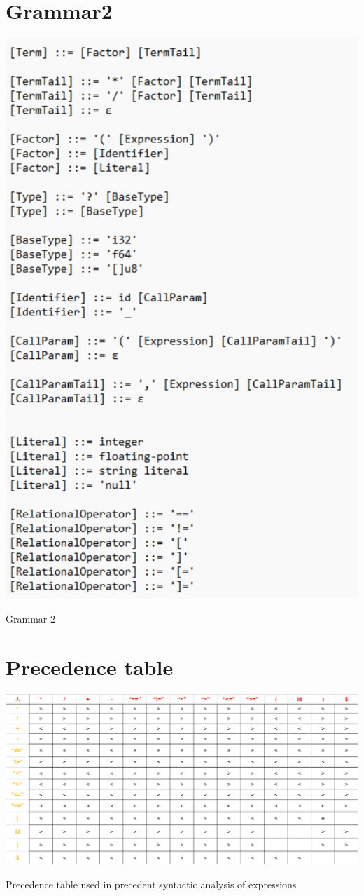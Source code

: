 \documentclass[a4paper, 11pt]{article}
\begin{document}
    
	\begin{table}[!ht]
        \section{Grammar2}
		\centering
		\includegraphics[width=0.7\linewidth]{Grammar2.pdf}
		\caption{Grammar 2}
		\label{table:png2pdf (2).pdf}
	\end{table}




	
	\begin{table}[!ht]
        \section{Precedence table}
		\centering
		\includegraphics[width=0.7\linewidth]{Precedence table.pdf}
		\caption{Precedence table used in precedent syntactic analysis of expressions}
		\label{table:prec_table}
	\end{table}
\end{document}
